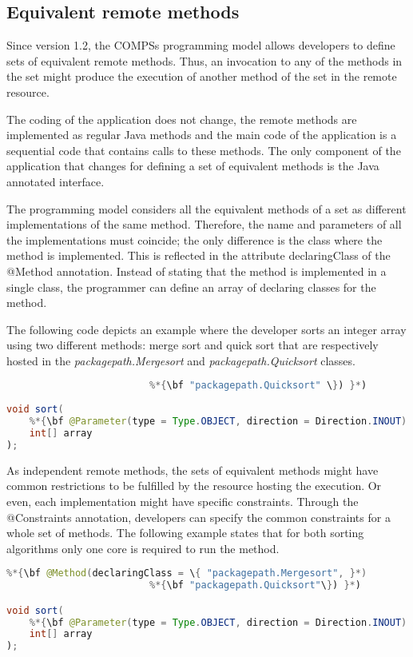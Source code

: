 \subsection{Equivalent remote methods}
Since version 1.2, the COMPSs programming model allows developers to define sets of equivalent remote
methods. Thus, an invocation to any of the methods in the set might produce the execution of another
method of the set in the remote resource.

The coding of the application does not change, the remote methods are implemented as regular Java
methods and the main code of the application is a sequential code that contains calls to these methods. The
only component of the application that changes for defining a set of equivalent methods is the Java
annotated interface.

The programming model considers all the equivalent methods of a set as different implementations of the
same method. Therefore, the name and parameters of all the implementations must coincide; the only
difference is the class where the method is implemented. This is reflected in the attribute declaringClass of
the @Method annotation. Instead of stating that the method is implemented in a single class, the
programmer can define an array of declaring classes for the method.

The following code depicts an example where the developer sorts an integer array using two different
methods: merge sort and quick sort that are respectively hosted in the {\it packagepath.Mergesort} and
{\it packagepath.Quicksort} classes.

\begin{lstlisting}[language=java]
%*{\bf @Method(declaringClass = \{ "packagepath.Mergesort", }*)
                         %*{\bf "packagepath.Quicksort" \}) }*)
                           
void sort(
    %*{\bf @Parameter(type = Type.OBJECT, direction = Direction.INOUT) }*)
    int[] array
);
\end{lstlisting}

As independent remote methods, the sets of equivalent methods might have common restrictions to be
fulfilled by the resource hosting the execution. Or even, each implementation might have specific constraints.
Through the @Constraints annotation, developers can specify the common constraints for a whole set of
methods. The following example states that for both sorting algorithms only one core is required to run the
method.

\begin{lstlisting}[language=java]
%*{\bf @Constraints(processorCoreCount = 1) }*)
%*{\bf @Method(declaringClass = \{ "packagepath.Mergesort", }*) 
                         %*{\bf "packagepath.Quicksort"\}) }*)

void sort(
    %*{\bf @Parameter(type = Type.OBJECT, direction = Direction.INOUT) }*)
    int[] array
);
\end{lstlisting}

